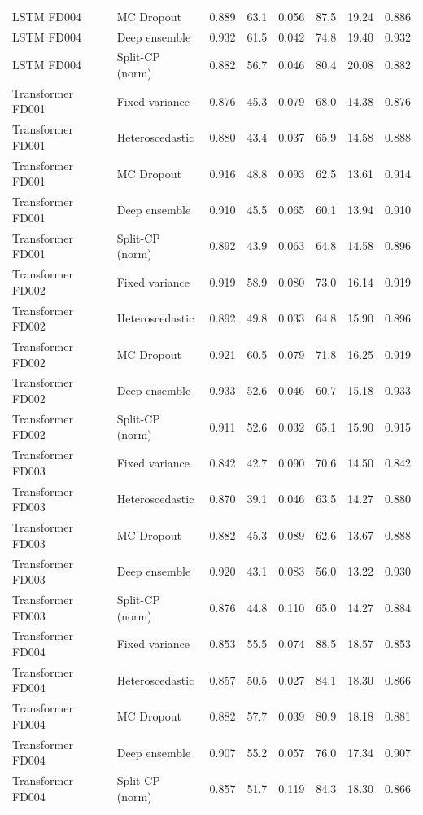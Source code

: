 \documentclass[10pt,a4paper]{article}
\begin{document}
\begin{table}[H]
\begin{tabular}{llccccc|c}
LSTM FD004 & MC Dropout & 0.889 & 63.1 & 0.056 & 87.5 & 19.24 & 0.886 \\
LSTM FD004 & Deep ensemble & 0.932 & 61.5 & 0.042 & 74.8 & 19.40 & 0.932 \\
LSTM FD004 & Split-CP (norm) & 0.882 & 56.7 & 0.046 & 80.4 & 20.08 & 0.882 \\
\midrule
Transformer FD001 & Fixed variance & 0.876 & 45.3 & 0.079 & 68.0 & 14.38 & 0.876 \\
Transformer FD001 & Heteroscedastic & 0.880 & 43.4 & 0.037 & 65.9 & 14.58 & 0.888 \\
Transformer FD001 & MC Dropout & 0.916 & 48.8 & 0.093 & 62.5 & 13.61 & 0.914 \\
Transformer FD001 & Deep ensemble & 0.910 & 45.5 & 0.065 & 60.1 & 13.94 & 0.910 \\
Transformer FD001 & Split-CP (norm) & 0.892 & 43.9 & 0.063 & 64.8 & 14.58 & 0.896 \\
\midrule
Transformer FD002 & Fixed variance & 0.919 & 58.9 & 0.080 & 73.0 & 16.14 & 0.919 \\
Transformer FD002 & Heteroscedastic & 0.892 & 49.8 & 0.033 & 64.8 & 15.90 & 0.896 \\
Transformer FD002 & MC Dropout & 0.921 & 60.5 & 0.079 & 71.8 & 16.25 & 0.919 \\
Transformer FD002 & Deep ensemble & 0.933 & 52.6 & 0.046 & 60.7 & 15.18 & 0.933 \\
Transformer FD002 & Split-CP (norm) & 0.911 & 52.6 & 0.032 & 65.1 & 15.90 & 0.915 \\
\midrule
Transformer FD003 & Fixed variance & 0.842 & 42.7 & 0.090 & 70.6 & 14.50 & 0.842 \\
Transformer FD003 & Heteroscedastic & 0.870 & 39.1 & 0.046 & 63.5 & 14.27 & 0.880 \\
Transformer FD003 & MC Dropout & 0.882 & 45.3 & 0.089 & 62.6 & 13.67 & 0.888 \\
Transformer FD003 & Deep ensemble & 0.920 & 43.1 & 0.083 & 56.0 & 13.22 & 0.930 \\
Transformer FD003 & Split-CP (norm) & 0.876 & 44.8 & 0.110 & 65.0 & 14.27 & 0.884 \\
\midrule
Transformer FD004 & Fixed variance & 0.853 & 55.5 & 0.074 & 88.5 & 18.57 & 0.853 \\
Transformer FD004 & Heteroscedastic & 0.857 & 50.5 & 0.027 & 84.1 & 18.30 & 0.866 \\
Transformer FD004 & MC Dropout & 0.882 & 57.7 & 0.039 & 80.9 & 18.18 & 0.881 \\
Transformer FD004 & Deep ensemble & 0.907 & 55.2 & 0.057 & 76.0 & 17.34 & 0.907 \\
Transformer FD004 & Split-CP (norm) & 0.857 & 51.7 & 0.119 & 84.3 & 18.30 & 0.866 \\
\bottomrule\end{tabular}
\end{table}
\end{document}
